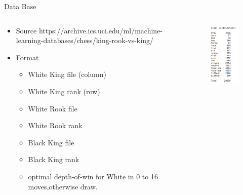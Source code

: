 \documentclass[final,hyperref={pdfpagelabels=false}]{beamer}
\begin{document}
\begin{frame}[t]
\begin{columns}[t]
\begin{column}{.465\textwidth}

\begin{block}{Data Base}

\begin{columns} %
\begin{column}{.54\textwidth} %
\begin{itemize}
\item {\large Source} https://archive.ics.uci.edu/ml/machine-learning-databases/chess/king-rook-vs-king/
\item {\large Format}
\begin{itemize}
\item White King file (column)
\item White King rank (row)
\item White Rook file
\item White Rook rank
\item Black King file
\item Black King rank
\item optimal depth-of-win for White in 0 to 16 moves,otherwise draw.
\end{itemize}
\end{itemize}
\end{column}
~\cite{data}
\begin{column}{.43\textwidth} %
\centering
\begin{figure}
\includegraphics[width=0.5\linewidth]{data_class_distribution.png}

\end{figure}
\end{column}
\end{columns}
\end{block}
\end{column}
\end{columns}
\end{frame}
\end{document}
